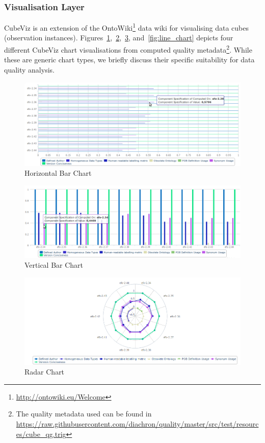 \subsubsection{Visualisation Layer}
\label{sec:vislayer_hla}
CubeViz is an extension of the OntoWiki\footnote{\url{http://ontowiki.eu/Welcome}} data wiki for visualising data cubes (observation instances).
Figures~\ref{fig:hor_chart},~\ref{fig:ver_chart},~\ref{fig:rad_chart}, and~\ref{fig:line_chart} depicts four different CubeViz chart visualisations from computed quality metadata\footnote{The quality metadata used can be found in \url{https://raw.githubusercontent.com/diachron/quality/master/src/test/resources/cube_qg.trig}}.  While these are generic chart types, we briefly discuss their specific suitability for data quality analysis.

\begin{figure}[tbph]
\center
  \includegraphics[scale=0.3]{images/cube_1.png}
\caption{Horizontal Bar Chart} 
  \label{fig:hor_chart}
\end{figure}

\begin{figure}[tbph]
\center
\includegraphics[scale=0.3]{images/cube_2.png} 
\caption{Vertical Bar Chart} 
\label{fig:ver_chart}
\end{figure}

\begin{figure}[tbph]
\center
\includegraphics[scale=0.3]{images/cube_3.png} 
\caption{Radar Chart} 
\label{fig:rad_chart}
\end{figure}

